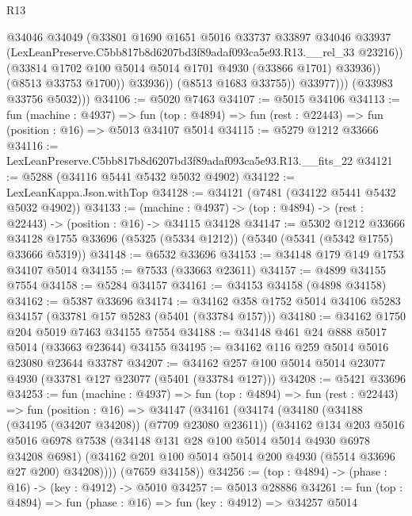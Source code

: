 \begin{lexlean}{R13}
\begin{coremodule}
                        @34046
                        @34049
                        (@33801
                          @1690
                          @1651
                          @5016
                          @33737
                          @33897
                          @34046
                          @33937
                          (LexLeanPreserve.C5bb817b8d6207bd3f89adaf093ca5e93.R13.__rel_33 @23216))
                        (@33814 @1702 @100 @5014 @5014 @1701 @4930 (@33866 @1701) @33936))
                      (@8513 @33753 @1700))
                    @33936))
                (@8513 @1683 @33755))
              @33977)))
        (@33983 @33756 @5032)))
@34106 := @5020 @7463
@34107 := @5015 @34106
@34113 := fun (machine : @4937) =>
  fun (top : @4894) => fun (rest : @22443) => fun (position : @16) => @5013 @34107 @5014
@34115 := @5279 @1212 @33666
@34116 := LexLeanPreserve.C5bb817b8d6207bd3f89adaf093ca5e93.R13.__fits_22
@34121 := @5288 (@34116 @5441 @5432 @5032 @4902)
@34122 := LexLeanKappa.Json.withTop
@34128 := @34121 (@7481 (@34122 @5441 @5432 @5032 @4902))
@34133 := (machine : @4937) -> (top : @4894) -> (rest : @22443) -> (position : @16) -> @34115 @34128
@34147 := @5302
    @1212
    @33666
    @34128
    @1755
    @33696
    (@5325 (@5334 @1212))
    (@5340 (@5341 (@5342 @1755) @33666 @5319))
@34148 := @6532 @33696
@34153 := @34148 @179 @149 @1753 @34107 @5014
@34155 := @7533 (@33663 @23611)
@34157 := @4899 @34155 @7554
@34158 := @5284 @34157
@34161 := @34153 @34158 (@4898 @34158)
@34162 := @5387 @33696
@34174 := @34162 @358 @1752 @5014 @34106 @5283 @34157 (@33781 @157 @5283 (@5401 (@33784 @157)))
@34180 := @34162 @1750 @204 @5019 @7463 @34155 @7554
@34188 := @34148 @461 @24 @888 @5017 @5014 (@33663 @23644) @34155
@34195 := @34162 @116 @259 @5014 @5016 @23080 @23644 @33787
@34207 := @34162 @257 @100 @5014 @5014 @23077 @4930 (@33781 @127 @23077 (@5401 (@33784 @127)))
@34208 := @5421 @33696
@34253 := fun (machine : @4937) =>
  fun (top : @4894) =>
  fun (rest : @22443) =>
  fun (position : @16) =>
  @34147
    (@34161
      (@34174
        (@34180
          (@34188 (@34195 (@34207 @34208)) (@7709 @23080 @23611))
          (@34162
            @134
            @203
            @5016
            @5016
            @6978
            @7538
            (@34148 @131 @28 @100 @5014 @5014 @4930 @6978 @34208 @6981)
            (@34162 @201 @100 @5014 @5014 @200 @4930 (@5514 @33696 @27 @200) @34208))))
      (@7659 @34158))
@34256 := (top : @4894) -> (phase : @16) -> (key : @4912) -> @5010
@34257 := @5013 @28886
@34261 := fun (top : @4894) => fun (phase : @16) => fun (key : @4912) => @34257 @5014

\end{coremodule}
\end{lexlean}
